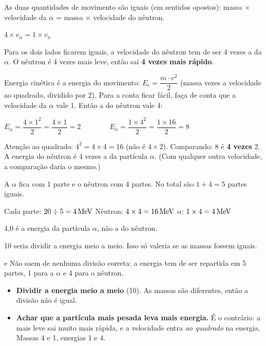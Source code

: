 As duas quantidades de movimento são iguais (em sentidos opostos): massa $\times$ velocidade da $\alpha$ = massa $\times$ velocidade do nêutron.
\begin{conta}
$4 \times v_\alpha = 1 \times v_n$
\end{conta}
Para os dois lados ficarem iguais, a velocidade do nêutron tem de ser 4 vezes a da $\alpha$.
O nêutron é 4 vezes mais leve, então sai \textbf{4 vezes mais rápido}.

Energia cinética é a energia do movimento: $E_c = \dfrac{m \cdot v^2}{2}$ (massa vezes a velocidade ao quadrado, dividido por 2).
Para a conta ficar fácil, faça de conta que a velocidade da $\alpha$ vale 1. Então a do nêutron vale 4:
\begin{conta}
$E_\alpha = \dfrac{4 \times 1^2}{2} = \dfrac{4 \times 1}{2} = 2
\qquad\qquad
E_n = \dfrac{1 \times 4^2}{2} = \dfrac{1 \times 16}{2} = 8$
\end{conta}
Atenção ao quadrado: $4^2 = 4 \times 4 = 16$ (não é $4 \times 2$).
Comparando: 8 é \textbf{4 vezes} 2. A energia do nêutron é 4 vezes a da partícula $\alpha$.
(Com qualquer outra velocidade, a comparação daria o mesmo.)

A $\alpha$ fica com 1 parte e o nêutron com 4 partes. No total são $1 + 4 = 5$ partes iguais.
\begin{conta}
Cada parte: $20 \div 5 = 4\,\text{MeV}$
\qquad\qquad
Nêutron: $4 \times 4 = 16\,\text{MeV}$
\qquad\qquad
$\alpha$: $1 \times 4 = 4\,\text{MeV}$
\end{conta}


\begin{outras}
 4,0 é a energia da partícula $\alpha$, não a do nêutron.\par
{} 10 seria dividir a energia meio a meio. Isso só valeria se as massas fossem iguais.\par
{} e  Não saem de nenhuma divisão correta: a energia tem de ser repartida em 5 partes, 1 para a $\alpha$ e 4 para o nêutron.
\end{outras}

\begin{pegadinha}
\begin{itemize}
  \item \textbf{Dividir a energia meio a meio} (10). As massas são diferentes, então a divisão não é igual.
  \item \textbf{Achar que a partícula mais pesada leva mais energia.} É o contrário: a mais leve sai muito mais rápida, e a
        velocidade entra \emph{ao quadrado} na energia. Massas 4 e 1, energias 1 e 4.
\end{itemize}
\end{pegadinha}

